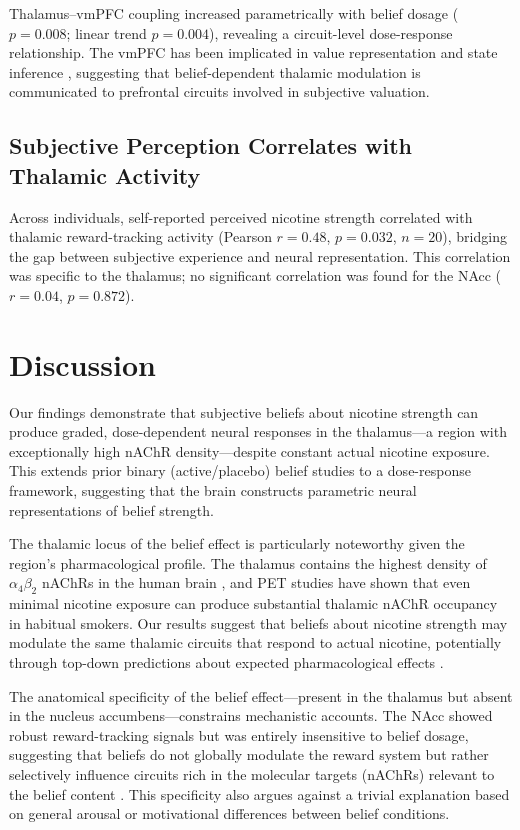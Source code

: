 \documentclass[11pt]{article}
\begin{document}
Thalamus--vmPFC coupling increased parametrically with belief dosage ($p = 0.008$; linear trend $p = 0.004$), revealing a circuit-level dose-response relationship. The vmPFC has been implicated in value representation and state inference \citep{bartra2013}, suggesting that belief-dependent thalamic modulation is communicated to prefrontal circuits involved in subjective valuation.

\subsection{Subjective Perception Correlates with Thalamic Activity}

Across individuals, self-reported perceived nicotine strength correlated with thalamic reward-tracking activity (Pearson $r = 0.48$, $p = 0.032$, $n = 20$), bridging the gap between subjective experience and neural representation. This correlation was specific to the thalamus; no significant correlation was found for the NAcc ($r = 0.04$, $p = 0.872$).

\section{Discussion}

Our findings demonstrate that subjective beliefs about nicotine strength can produce graded, dose-dependent neural responses in the thalamus---a region with exceptionally high nAChR density---despite constant actual nicotine exposure. This extends prior binary (active/placebo) belief studies \citep{gu2015, volkow2003} to a dose-response framework, suggesting that the brain constructs parametric neural representations of belief strength.

The thalamic locus of the belief effect is particularly noteworthy given the region's pharmacological profile. The thalamus contains the highest density of $\alpha_4\beta_2$ nAChRs in the human brain \citep{brody2006}, and PET studies have shown that even minimal nicotine exposure can produce substantial thalamic nAChR occupancy in habitual smokers. Our results suggest that beliefs about nicotine strength may modulate the same thalamic circuits that respond to actual nicotine, potentially through top-down predictions about expected pharmacological effects \citep{friston2010}.

The anatomical specificity of the belief effect---present in the thalamus but absent in the nucleus accumbens---constrains mechanistic accounts. The NAcc showed robust reward-tracking signals but was entirely insensitive to belief dosage, suggesting that beliefs do not globally modulate the reward system but rather selectively influence circuits rich in the molecular targets (nAChRs) relevant to the belief content \citep{picciotto2012, dani2011}. This specificity also argues against a trivial explanation based on general arousal or motivational differences between belief conditions.
\end{document}
